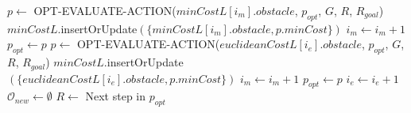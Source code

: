 \begin{algorithm}[H]
\begin{algorithmic}[1]
                \State $p \gets$ OPT-EVALUATE-ACTION($minCostL[i_{m}].obstacle$, $p_{opt}$, $G$, $R$, $R_{goal}$)
                  \State $minCostL.$insertOrUpdate$(\{minCostL[i_{m}].obstacle, p.minCost\})$
                  \State $i_{m} \gets i_{m} + 1$
                    \State $p_{opt} \gets p$
                  \EndIf
                \EndIf
              \Else
                  \State $p \gets$ OPT-EVALUATE-ACTION($euclideanCostL[i_{e}].obstacle$, $p_{opt}$, $G$, $R$, $R_{goal}$)
                    \State $minCostL.$insertOrUpdate$(\{euclideanCostL[i_{e}].obstacle, p.minCost\})$
                    \State $i_{m} \gets i_{m} + 1$
                      \State $p_{opt} \gets p$
                    \EndIf
                  \EndIf
                \EndIf
              \EndIf
              \State $i_{e} \gets i_{e} + 1$
            \EndWhile
            \State $\mathcal{O}_{new} \gets \emptyset$
          \EndIf
          \State $R \gets$ Next step in $p_{opt}$
        \EndWhile
    \EndProcedure


  \end{algorithmic}
\end{algorithm}
